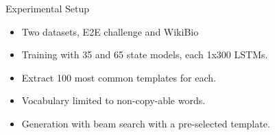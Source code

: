 \begin{frame}{Experimental Setup}

  \begin{itemize}
  \item Two datasets, E2E challenge and WikiBio
    \air
  \item Training with 35 and 65 state models, each 1x300 LSTMs.
    \air
  \item Extract 100 most common templates for each.
    \air
  \item Vocabulary limited to non-copy-able words.
    \air

  \item Generation with beam search with a pre-selected template.
  \end{itemize}
\end{frame}











